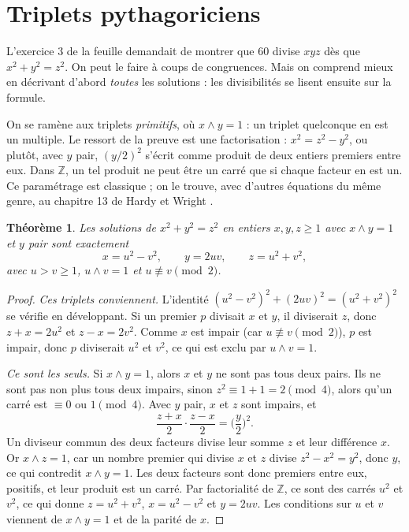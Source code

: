 \documentclass[11pt,a4paper]{article}
\theoremstyle{plain}
\newtheorem{theoreme}{Théorème}[section]
\theoremstyle{definition}
\theoremstyle{remark}
\newcommand{\Z}{\mathbb{Z}}
\newcommand{\pgcd}{\wedge}
\begin{document}
\section{Triplets pythagoriciens}

L'exercice 3 de la feuille demandait de montrer que $60$ divise $xyz$ dès que $x^2+y^2=z^2$. On peut le faire à coups de congruences. Mais on comprend mieux en décrivant d'abord \emph{toutes} les solutions : les divisibilités se lisent ensuite sur la formule.

On se ramène aux triplets \emph{primitifs}, où $x\pgcd y=1$ : un triplet quelconque en est un multiple. Le ressort de la preuve est une factorisation : $x^2=z^2-y^2$, ou plutôt, avec $y$ pair, $(y/2)^2$ s'écrit comme produit de deux entiers premiers entre eux. Dans $\Z$, un tel produit ne peut être un carré que si chaque facteur en est un. Ce paramétrage est classique ; on le trouve, avec d'autres équations du même genre, au chapitre 13 de Hardy et Wright \cite{hw}.

\begin{theoreme}\label{thm:pyth}
Les solutions de $x^2+y^2=z^2$ en entiers $x,y,z\geq1$ avec $x\pgcd y=1$ et $y$ pair sont exactement
\[
  x=u^2-v^2,\qquad y=2uv,\qquad z=u^2+v^2,
\]
avec $u>v\geq1$, $u\pgcd v=1$ et $u\not\equiv v\pmod 2$.
\end{theoreme}

\begin{proof}
\emph{Ces triplets conviennent.} L'identité $(u^2-v^2)^2+(2uv)^2=(u^2+v^2)^2$ se vérifie en développant. Si un premier $p$ divisait $x$ et $y$, il diviserait $z$, donc $z+x=2u^2$ et $z-x=2v^2$. Comme $x$ est impair (car $u\not\equiv v\pmod2$), $p$ est impair, donc $p$ diviserait $u^2$ et $v^2$, ce qui est exclu par $u\pgcd v=1$.

\emph{Ce sont les seuls.} Si $x\pgcd y=1$, alors $x$ et $y$ ne sont pas tous deux pairs. Ils ne sont pas non plus tous deux impairs, sinon $z^2\equiv1+1=2\pmod4$, alors qu'un carré est $\equiv0$ ou $1\pmod4$. Avec $y$ pair, $x$ et $z$ sont impairs, et
\[
  \frac{z+x}{2}\cdot\frac{z-x}{2}=\Big(\frac y2\Big)^2 .
\]
Un diviseur commun des deux facteurs divise leur somme $z$ et leur différence $x$. Or $x\pgcd z=1$, car un nombre premier qui divise $x$ et $z$ divise $z^2-x^2=y^2$, donc $y$, ce qui contredit $x\pgcd y=1$. Les deux facteurs sont donc premiers entre eux, positifs, et leur produit est un carré. Par factorialité de $\Z$, ce sont des carrés $u^2$ et $v^2$, ce qui donne $z=u^2+v^2$, $x=u^2-v^2$ et $y=2uv$. Les conditions sur $u$ et $v$ viennent de $x\pgcd y=1$ et de la parité de $x$.
\end{proof}
\end{document}
